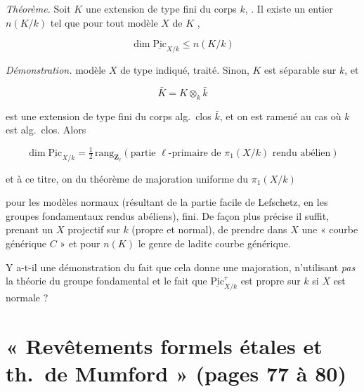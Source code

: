 \documentclass[11pt,a4paper]{article}
\begin{document}

\emph{Théorème.} Soit $K$ une extension de type fini du corps $k$,
.  Il existe un entier
$n(K/k)$ tel que pour tout modèle $X$ de $K$ , \ill{} \struck{\ill{}}

\[ \dim \underline{\mathrm{Pic}}_{X/k} \leq n(K/k) \]

\emph{Démonstration.}  
modèle $X$ de type indiqué, \ill{} traité. Sinon, $K$ est séparable sur $k$,
et

\[ \bar K = K \otimes_k \bar k \]

est une extension de type fini du corps alg.\ clos $\bar k$, et on est
ramené au cas où $k$ est alg.\ clos. Alors

\[ \dim \underline{\mathrm{Pic}}_{X/k} = \tfrac{1}{2}\,
   \mathrm{rang}_{\mathbf{Z}_{\ell}}
   \left(\text{partie } \ell\text{-primaire de } \pi_1(X/k)
   \text{ rendu abélien}\right) \]

et à ce titre, on  du théorème de majoration uniforme du
$\pi_1(X/k)$

pour les modèles normaux (résultant de la partie facile de Lefschetz, en
\ill{} \ill{} les groupes fondamentaux rendus abéliens), \ill{} \ill{} fini.
De façon plus précise il suffit, prenant un  $X$ projectif sur
$k$ (propre et normal), de prendre dans $X$ une « courbe générique $C$ » et
pour $n(K)$ le genre de ladite courbe générique.


Y a-t-il une démonstration du fait que cela donne une majoration,
n'utilisant \emph{pas} la théorie du groupe fondamental et le fait que
$\underline{\mathrm{Pic}}^{\tau}_{X/k}$ est propre sur $k$ si $X$ est
normale ?


\section*{« Revêtements formels étales et th.\ de Mumford » (pages 77 à 80)}
\end{document}
